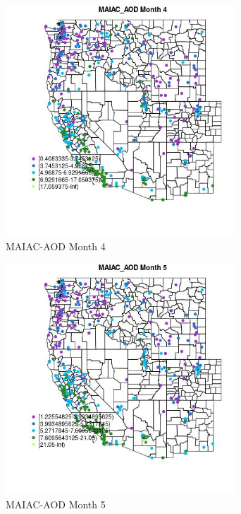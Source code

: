 \begin{figure} 
\centering  
\includegraphics[width=0.77\textwidth]{Code_Outputs/ML_input_report_ML_input_PM25_Step5_part_d_de_duplicated_aves_ML_input_MapObsMo4MAIAC_AOD.jpg} 
\caption{\label{fig:ML_input_report_ML_input_PM25_Step5_part_d_de_duplicated_aves_ML_inputMapObsMo4MAIAC_AOD}MAIAC-AOD Month 4} 
\end{figure} 
 

\begin{figure} 
\centering  
\includegraphics[width=0.77\textwidth]{Code_Outputs/ML_input_report_ML_input_PM25_Step5_part_d_de_duplicated_aves_ML_input_MapObsMo5MAIAC_AOD.jpg} 
\caption{\label{fig:ML_input_report_ML_input_PM25_Step5_part_d_de_duplicated_aves_ML_inputMapObsMo5MAIAC_AOD}MAIAC-AOD Month 5} 
\end{figure} 
 

